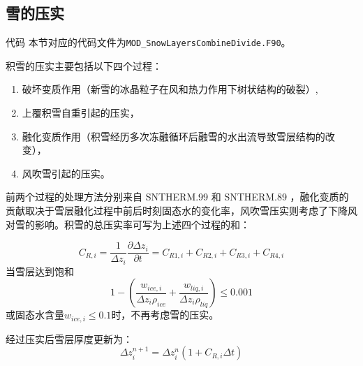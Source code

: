 \subsection{雪的压实}
\begin{mymdframed}{代码}
本节对应的代码文件为\texttt{MOD\_SnowLayersCombineDivide.F90}。
\end{mymdframed}

积雪的压实主要包括以下四个过程：
\begin{enumerate}
\item 破坏变质作用（新雪的冰晶粒子在风和热力作用下树状结构的破裂）,
\item 上覆积雪自重引起的压实，
\item 融化变质作用（积雪经历多次冻融循环后融雪的水出流导致雪层结构的改变），
\item 风吹雪引起的压实。
\end{enumerate}

前两个过程的处理方法分别来自 SNTHERM.99 \citep{jordan1999heat}和 SNTHERM.89 \citep{jordan1991one}，融化变质的贡献取决于雪层融化过程中前后时刻固态水的变化率，风吹雪压实则考虑了下降风对雪的影响。积雪的总压实率可写为上述四个过程的和：

\begin{equation}
C_{R,i}=\frac{1}{\Delta {z_i}} \frac{\partial \Delta {z_i}}{\partial {t}}=C_{R1,i}+C_{R2,i}+C_{R3,i}+C_{R4,i}
\end{equation}
当雪层达到饱和
\begin{equation}
1-\left(\frac{w_{ice,i}}{ \Delta {z_i} \rho_{ice}}+\frac{w_{liq,i}}{ \Delta {z_i} \rho_{liq}}\right) \leqslant 0.001
\end{equation}
或固态水含量$w_{ice,i}\leqslant0.1$时，不再考虑雪的压实。

经过压实后雪层厚度更新为：
\begin{equation}
\Delta z_i^{n+1}=\Delta z_i^n\left(1+C_{R, i} \Delta t\right)
\end{equation}


